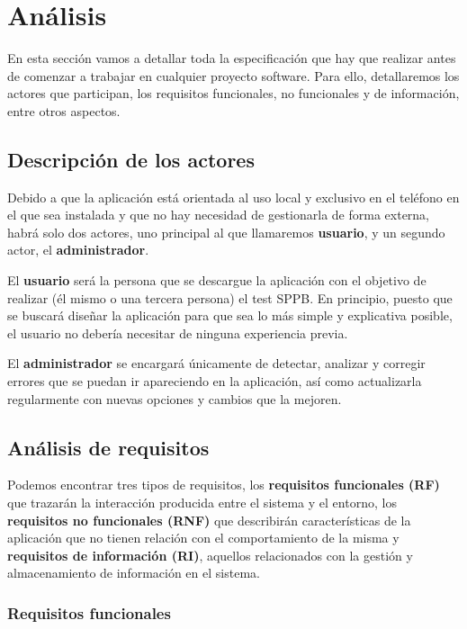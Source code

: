 \chapter{Análisis}

En esta sección vamos a detallar toda la especificación que hay que realizar antes de comenzar a trabajar en cualquier proyecto software. Para ello, detallaremos los actores que participan, los requisitos funcionales, no funcionales y de información, entre otros aspectos.

\section{Descripción de los actores}

Debido a que la aplicación está orientada al uso local y exclusivo en el teléfono en el que sea instalada y que no hay necesidad de gestionarla de forma externa, habrá solo dos actores, uno principal al que llamaremos \textbf{usuario}, y un segundo actor, el \textbf{administrador}.

El \textbf{usuario} será la persona que se descargue la aplicación con el objetivo de realizar (él mismo o una tercera persona) el test SPPB. En principio, puesto que se buscará diseñar la aplicación para que sea lo más simple y explicativa posible, el usuario no debería necesitar de ninguna experiencia previa. 

El \textbf{administrador} se encargará únicamente de detectar, analizar y corregir errores que se puedan ir apareciendo en la aplicación, así como actualizarla regularmente con nuevas opciones y cambios que la mejoren.

\section{Análisis de requisitos}

Podemos encontrar tres tipos de requisitos, los \textbf{requisitos funcionales (RF)} que trazarán la interacción producida entre el sistema y el entorno, los \textbf{requisitos no funcionales (RNF)} que describirán características de la aplicación que no tienen relación con el comportamiento de la misma y \textbf{requisitos de información (RI)}, aquellos relacionados con la gestión y almacenamiento de información en el sistema.

\subsection{Requisitos funcionales}

